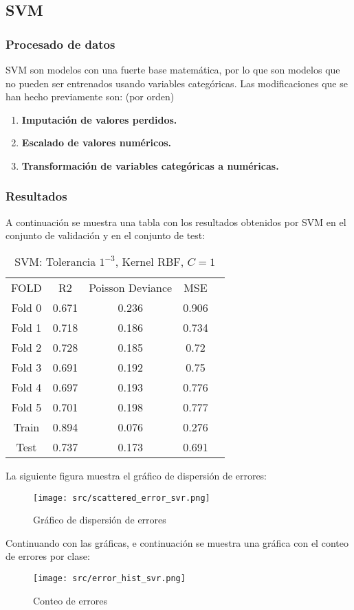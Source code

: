 \subsection{SVM}

\subsubsection*{Procesado de datos}
SVM son modelos con una fuerte base matemática, por lo que son modelos que no pueden ser entrenados usando variables categóricas.
Las modificaciones que se han hecho previamente son: (por orden)
\begin{enumerate}
	\item \textbf{Imputación de valores perdidos.}
	\item \textbf{Escalado de valores numéricos.}
	\item \textbf{Transformación de variables categóricas a numéricas.}
\end{enumerate}
\subsubsection*{Resultados}
A continuación se muestra una tabla con los resultados obtenidos por SVM en el conjunto de validación y en el conjunto de test:
\begin{table}[H]
	\centering
	\begin{tabular}{|c|c|c|c|c}
		\cline{1-4}
		FOLD   & R2    & Poisson Deviance & MSE   \\ \cline{1-4}
		Fold 0 & 0.671 & 0.236            & 0.906 \\ \cline{1-4}
		Fold 1 & 0.718 & 0.186            & 0.734 \\ \cline{1-4}
		Fold 2 & 0.728 & 0.185            & 0.72  \\ \cline{1-4}
		Fold 3 & 0.691 & 0.192            & 0.75  \\ \cline{1-4}
		Fold 4 & 0.697 & 0.193            & 0.776 \\ \cline{1-4}
		Fold 5 & 0.701 & 0.198            & 0.777 \\ \cline{1-4}
		Train  & 0.894 & 0.076            & 0.276 \\ \cline{1-4}
		Test   & 0.737 & 0.173            & 0.691 \\ \cline{1-4}
	\end{tabular}
	\caption{SVM: Tolerancia $1^{-3}$, Kernel RBF, $C=1$}
	\label{tab:svm_res}
\end{table}
La siguiente figura muestra el gráfico de dispersión de errores:
\begin{figure}[H]
	\centering
	\texttt{[image: src/scattered\_error\_svr.png]}
	\caption{Gráfico de dispersión de errores}
	\label{fig:svr_scattered}
\end{figure}
Continuando con las gráficas, e continuación se muestra una gráfica con el conteo de errores por clase:\\
\linebreak
\begin{figure}[H]
	\centering
	\texttt{[image: src/error\_hist\_svr.png]}
	\caption{Conteo de errores}
	\label{fig:svr_error_plot}
\end{figure}
